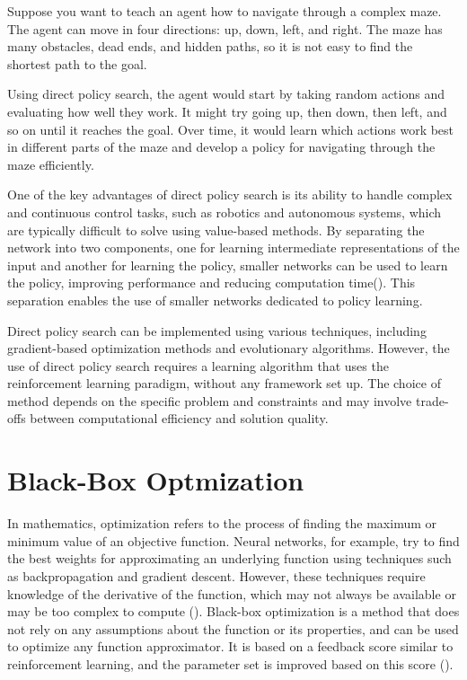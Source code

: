 Suppose you want to teach an agent how to navigate through a complex maze. The agent can move in four directions: up, down, left, and right. The maze has many obstacles, dead ends, and hidden paths, so it is not easy to find the shortest path to the goal.

Using direct policy search, the agent would start by taking random actions and evaluating how well they work. It might try going up, then down, then left, and so on until it reaches the goal. Over time, it would learn which actions work best in different parts of the maze and develop a policy for navigating through the maze efficiently.

One of the key advantages of direct policy search is its ability to handle complex and continuous control tasks, such as robotics and autonomous systems, which are typically difficult to solve using value-based methods. By separating the network into two components, one for learning intermediate representations of the input and another for learning the policy, smaller networks can be used to learn the policy, improving performance and reducing computation time(\cite{cuccu_playing_2019}). This separation enables the use of smaller networks dedicated to policy learning.

Direct policy search can be implemented using various techniques, including gradient-based optimization methods and evolutionary algorithms. However, the use of direct policy search requires a learning algorithm that uses the reinforcement learning paradigm, without any framework set up. The choice of method depends on the specific problem and constraints and may involve trade-offs between computational efficiency and solution quality.

\section{Black-Box Optmization}

In mathematics, optimization refers to the process of finding the maximum or minimum value of an objective function. Neural networks, for example, try to find the best weights for approximating an underlying function using techniques such as backpropagation and gradient descent. However, these techniques require knowledge of the derivative of the function, which may not always be available or may be too complex to compute (\cite{schaul_studies_nodate}). Black-box optimization is a method that does not rely on any assumptions about the function or its properties, and can be used to optimize any function approximator. It is based on a feedback score similar to reinforcement learning, and the parameter set is improved based on this score (\cite{anderson_introduction_1995}).

